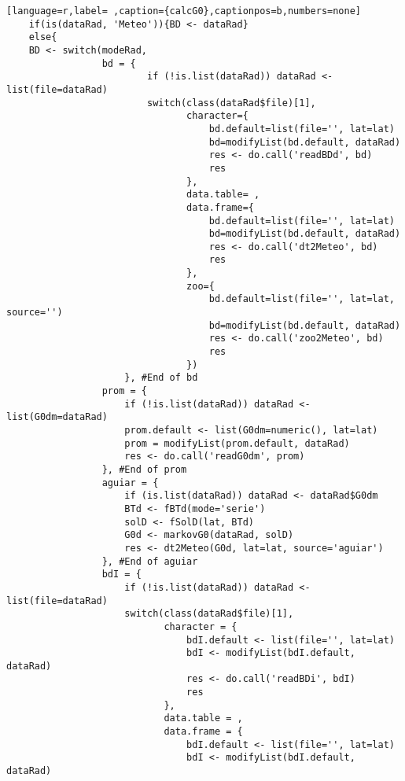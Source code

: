 \begin{lstlisting}[language=r,label= ,caption={calcG0},captionpos=b,numbers=none]
    if(is(dataRad, 'Meteo')){BD <- dataRad}
    else{
    BD <- switch(modeRad,
                 bd = {
                         if (!is.list(dataRad)) dataRad <- list(file=dataRad)
                         switch(class(dataRad$file)[1],
                                character={
                                    bd.default=list(file='', lat=lat)
                                    bd=modifyList(bd.default, dataRad)
                                    res <- do.call('readBDd', bd)
                                    res
                                },
                                data.table= ,
                                data.frame={
                                    bd.default=list(file='', lat=lat)
                                    bd=modifyList(bd.default, dataRad)
                                    res <- do.call('dt2Meteo', bd)
                                    res
                                },
                                zoo={
                                    bd.default=list(file='', lat=lat, source='')
                                    bd=modifyList(bd.default, dataRad)
                                    res <- do.call('zoo2Meteo', bd)
                                    res
                                })
                     }, #End of bd
                 prom = {
                     if (!is.list(dataRad)) dataRad <- list(G0dm=dataRad)
                     prom.default <- list(G0dm=numeric(), lat=lat)
                     prom = modifyList(prom.default, dataRad)
                     res <- do.call('readG0dm', prom)
                 }, #End of prom
                 aguiar = {
                     if (is.list(dataRad)) dataRad <- dataRad$G0dm
                     BTd <- fBTd(mode='serie')
                     solD <- fSolD(lat, BTd)
                     G0d <- markovG0(dataRad, solD)
                     res <- dt2Meteo(G0d, lat=lat, source='aguiar')
                 }, #End of aguiar
                 bdI = {
                     if (!is.list(dataRad)) dataRad <- list(file=dataRad)
                     switch(class(dataRad$file)[1],
                            character = {
                                bdI.default <- list(file='', lat=lat)
                                bdI <- modifyList(bdI.default, dataRad)
                                res <- do.call('readBDi', bdI)
                                res
                            },
                            data.table = ,
                            data.frame = {
                                bdI.default <- list(file='', lat=lat)
                                bdI <- modifyList(bdI.default, dataRad)

\end{lstlisting}
